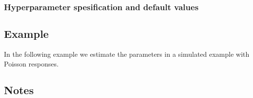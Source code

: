 \documentclass[a4paper,11pt]{article}
\begin{document}
\subsubsection*{Hyperparameter spesification and default values}


\subsection*{Example}

In the following example we estimate the parameters in a simulated
example with Poisson responses.


\subsection*{Notes}
\end{document}
